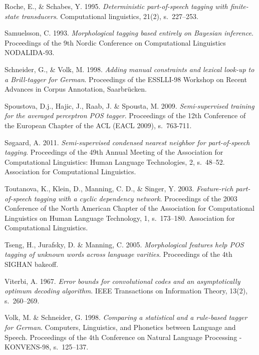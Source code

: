 \documentclass[utf8,bachelor,manualbib]{gradu3}
\begin{document}
\begin{thebibliography}{}
Roche, E., \& Schabes, Y. 1995. \textit{Deterministic part-of-speech tagging with finite-state transducers}. Computational linguistics, 21(2), s.~227--253.

Samuelsson, C. 1993. \textit{Morphological tagging based entirely on Bayesian inference}. Proceedings of the 9th Nordic Conference on Computational Linguistics NODALIDA-93.

Schneider, G., \& Volk, M. 1998. \textit{Adding manual constraints and lexical look-up to a Brill-tagger for German}. Proceedings of the ESSLLI-98 Workshop on Recent Advances in Corpus Annotation, Saarbrücken.

Spoustova, D.j., Hajic, J., Raab, J. \& Spousta, M. 2009. \textit{Semi-supervised training for the averaged perceptron POS tagger}. Proceedings of the 12th Conference of the
European Chapter of the ACL (EACL 2009), s.~763-711.

Søgaard, A. 2011. \textit{Semi-supervised condensed nearest neighbor for part-of-speech tagging}. Proceedings of the 49th Annual Meeting of the Association for Computational Linguistics: Human Language Technologies, 2, s.~48--52. Association for Computational Linguistics.

Toutanova, K., Klein, D., Manning, C. D., \& Singer, Y. 2003. \textit{Feature-rich part-of-speech tagging with a cyclic dependency network}. Proceedings of the 2003 Conference of the North American Chapter of the Association for Computational Linguistics on Human Language Technology, 1, s.~173--180. Association for Computational Linguistics.

Tseng, H., Jurafsky, D. \& Manning, C. 2005. \textit{Morphological features help POS tagging of unknown words across language varities}. Proceedings of the 4th SIGHAN bakeoff.

Viterbi, A. 1967. \textit{Error bounds for convolutional codes and an asymptotically optimum decoding algorithm}. IEEE Transactions on Information Theory, 13(2), s.~260--269.

Volk, M. \& Schneider, G. 1998. \textit{Comparing a statistical and a rule-based tagger for German}. Computers, Linguistics, and Phonetics between Language and Speech. Proceedings
of the 4th Conference on Natural Language Processing - KONVENS-98, s.~125--137.

\end{thebibliography}
\end{document}
